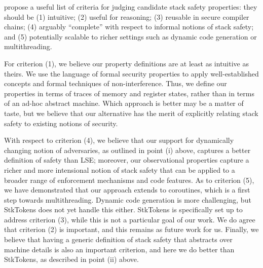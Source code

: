 \documentclass[acmsmall,review,anonymous]{acmart}\settopmatter{printfolios=true,printccs=false,printacmref=false}
\begin{document}
{\begin{enumerate}[label=(\roman*)]
\end{enumerate}

\citet{SkorstengaardSTKJFP} propose a useful list of criteria for judging
candidate stack safety properties: they should be (1) intuitive; (2)
useful for reasoning; (3) reusable in secure compiler chains; (4)
arguably ``complete'' with respect to informal notions of stack
safety; and (5) potentially scalable to richer settings such as
dynamic code generation or multithreading.

For criterion (1), we believe our property definitions are at least as intuitive
as theirs.
We use the language of formal security
properties to apply well-established concepts and formal techniques
of non-interference. Thus, we define our properties in terms of
traces of memory and register states, rather than in terms of an
ad-hoc abstract machine.
Which approach is better may be a matter of taste, but we believe that our
alternative has the merit of explicitly relating stack safety to existing
notions of security.

With respect to criterion (4), we believe that our support
for dynamically changing notion of adversaries, as outlined in point (i) above,
captures a better definition of safety than LSE; moreover, our observational
properties capture a richer and more intensional notion of stack safety
that can be applied to a broader range of enforcement mechanisms and code features.
As to criterion (5), we have demonstrated that our approach extends
to coroutines, which is a first step towards multithreading.
Dynamic code generation is more challenging, but StkTokens does not yet
handle this either.
StkTokens is specifically set up to address criterion (3), while this is not
a particular goal of our work. We do agree that criterion (2) is important,
and this remains as future work for us.
Finally, we believe that having a generic definition of stack
safety that abstracts over machine details is also
an important criterion, and here we do better than StkTokens, as described
in point (ii) above.


}
\end{document}
